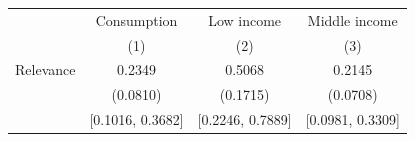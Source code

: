\begin{threeparttable}
\begin{tabular}{l | ccc}
\toprule
& \multicolumn{1}{c}{Consumption} & \multicolumn{1}{c}{Low income} & \multicolumn{1}{c}{Middle income} \\
& (1) & (2) & (3) \\
\midrule
  Relevance & 0.2349 & 0.5068 & 0.2145 \\
           & (0.0810) & (0.1715) & (0.0708) \\
           & [0.1016, 0.3682] & [0.2246, 0.7889] & [0.0981, 0.3309] \\
\bottomrule
\end{tabular}
\end{threeparttable}
